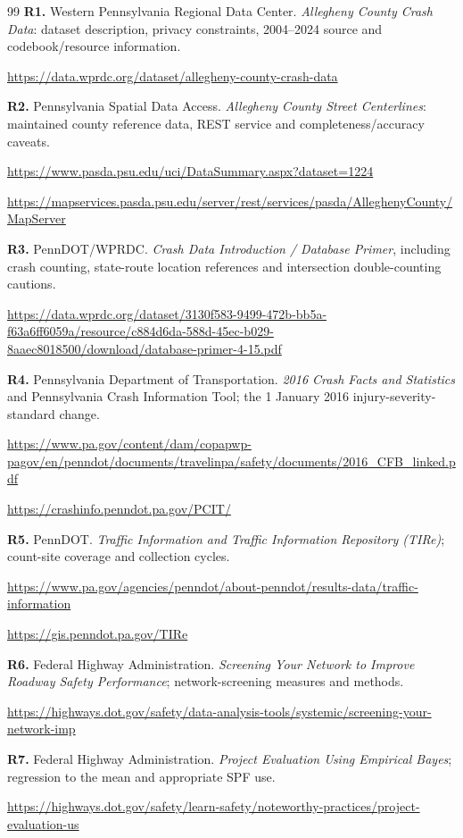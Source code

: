 \documentclass[11pt,a4paper,openany]{report}
\begin{document}
\begin{thebibliography}{99}
\textbf{R1.} Western Pennsylvania Regional Data Center. \emph{Allegheny County Crash Data}: dataset description, privacy constraints, 2004--2024 source and codebook/resource information.\par\url{https://data.wprdc.org/dataset/allegheny-county-crash-data}

\textbf{R2.} Pennsylvania Spatial Data Access. \emph{Allegheny County Street Centerlines}: maintained county reference data, REST service and completeness/accuracy caveats.\par\url{https://www.pasda.psu.edu/uci/DataSummary.aspx?dataset=1224}\par\url{https://mapservices.pasda.psu.edu/server/rest/services/pasda/AlleghenyCounty/MapServer}

\textbf{R3.} PennDOT/WPRDC. \emph{Crash Data Introduction / Database Primer}, including crash counting, state-route location references and intersection double-counting cautions.\par\url{https://data.wprdc.org/dataset/3130f583-9499-472b-bb5a-f63a6ff6059a/resource/c884d6da-588d-45ec-b029-8aaec8018500/download/database-primer-4-15.pdf}

\textbf{R4.} Pennsylvania Department of Transportation. \emph{2016 Crash Facts and Statistics} and Pennsylvania Crash Information Tool; the 1 January 2016 injury-severity-standard change.\par\url{https://www.pa.gov/content/dam/copapwp-pagov/en/penndot/documents/travelinpa/safety/documents/2016_CFB_linked.pdf}\par\url{https://crashinfo.penndot.pa.gov/PCIT/}

\textbf{R5.} PennDOT. \emph{Traffic Information and Traffic Information Repository (TIRe)}; count-site coverage and collection cycles.\par\url{https://www.pa.gov/agencies/penndot/about-penndot/results-data/traffic-information}\par\url{https://gis.penndot.pa.gov/TIRe}

\textbf{R6.} Federal Highway Administration. \emph{Screening Your Network to Improve Roadway Safety Performance}; network-screening measures and methods.\par\url{https://highways.dot.gov/safety/data-analysis-tools/systemic/screening-your-network-imp}

\textbf{R7.} Federal Highway Administration. \emph{Project Evaluation Using Empirical Bayes}; regression to the mean and appropriate SPF use.\par\url{https://highways.dot.gov/safety/learn-safety/noteworthy-practices/project-evaluation-us}


\end{thebibliography}
\end{document}
